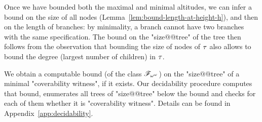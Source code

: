 Once we have bounded both the maximal and minimal altitudes, we can infer a bound on the size of all nodes (Lemma~\ref{lem:bound-length-at-height-h}), and then on the length of branches: by minimality, a branch cannot have two branches with the same specification. 
The bound on the "size@@tree" of the tree then follows from the observation that bounding the size of nodes of $\tau$ also allows to bound the degree (largest number of children) in $\tau$.
 



We obtain a computable bound (of the class $\mathscr{F}_{\omega^\omega}$) on the "size@@tree" of a minimal "coverability witness", if it exists. Our decidability procedure computes that bound, enumerates all trees of "size@@tree" below the bound and checks for each of them whether it is "coverability witness". Details can be found in Appendix~\ref{app:decidability}.

\decidablecover*
{}


